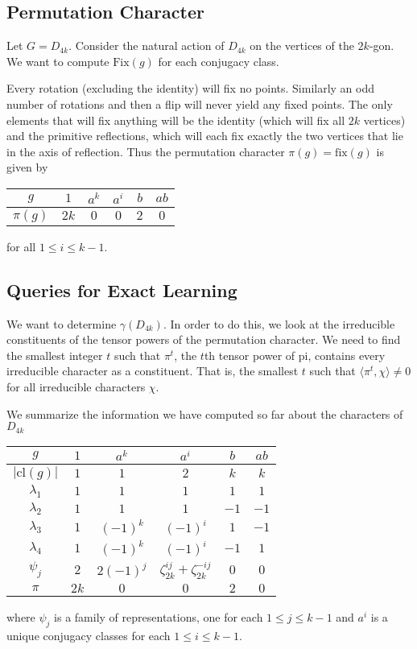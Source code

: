 \subsection{Permutation Character}



Let $G = D_{4k}$. Consider the natural action of $D_{4k}$ on the vertices of the $2k$-gon. We want to compute 
$\text{Fix}(g)$ for each conjugacy class.


Every rotation (excluding the identity) will fix no points. Similarly an odd number of rotations and then a flip 
will never yield any fixed points.  The only elements that will fix anything will be the identity (which will fix 
all $2k$ vertices) and the primitive reflections, which will each fix exactly the two vertices that lie in the axis 
of reflection. Thus the permutation character $\pi(g) = \text{fix}(g)$ is given by
\begin{center}
\begin{tabular}{c|ccccc}
    $g$ &$1$ & $a^k$ & $a^i$ & $b$ & $ab$ \\ \hline
    $\pi(g)$ & $2k$ & $0$ & $0$ & $2$ & $0$ \\
\end{tabular}
\end{center}
for all $1 \leq i \leq k-1$.

\subsection{Queries for Exact Learning}

We want to determine $\gamma(D_{4k})$. In order to do this, we look at the irreducible constituents of the tensor 
powers of the permutation character. We need to find the smallest integer $t$ such that $\pi^t$, the $t$th tensor 
power of pi, contains every irreducible character as a constituent. That is, the smallest $t$ such that $\langle 
\pi^t, \chi \rangle \neq 0$ for all irreducible characters $\chi$.


We summarize the information we have computed so far about the characters of $D_{4k}$

\def\cl{\text{cl}}
\begin{center}
\begin{tabular}{c|ccccc}
    $g$ &$1$ & $a^k$ & $a^i$ & $b$ & $ab$ \\ \hline
    $|\cl(g)|$ & $1$ & $1$ & $2$ & $k$ & $k$ \\ \hline
%
    $\lambda_1$ & $1$ & $1$ & $1$ & $1$ & $1$ \\
    $\lambda_2$ & $1$ & $1$ & $1$ & $-1$ & $-1$ \\
    $\lambda_3$ & $1$ & $(-1)^k$ & $(-1)^i$ & $1$ & $-1$ \\
    $\lambda_4$ & $1$ & $(-1)^k$ & $(-1)^i$ & $-1$ & $1$ \\
    $\psi_j$ & $2$ & $2(-1)^j$ & $\zeta_{2k}^{ij} + \zeta_{2k}^{-ij}$ & $0$ & $0$ \\ \hline
    $\pi$ & $2k$ & $0$ & $0$ & $2$ & $0$ 
\end{tabular}
\end{center}
where $\psi_j$ is a family of representations, one for each $1 \leq j \leq k-1$ and $a^i$ is a unique conjugacy 
classes for each $1 \leq i \leq k-1$.

